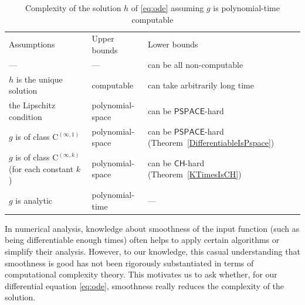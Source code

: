 \documentclass[12pt,a4paper]{article}
\theoremstyle{definition}
\theoremstyle{remark}
\newcommand{\classPSPACE}{\mathsf{PSPACE}}
\newcommand{\classCH}{\mathsf{CH}}
\newcommand{\classC}{\mathrm C}
\begin{document}
\begin{table}
\renewcommand\arraystretch{1.3}
\begin{center}
 \caption{Complexity of the solution $h$ of \eqref{eq:ode}
 assuming $g$ is polynomial-time computable}
 \label{table:related}
\small\vspace{3pt}
 \begin{tabular}{lll}
  Assumptions & Upper bounds & Lower bounds \\
  \noalign{\smallskip}
  \hline
  \noalign{\smallskip}
   --- & --- & can be all non-computable \cite{pour1979computable} \\
  $h$ is the unique solution & computable \cite{coddington1955theory}
  & \parbox[t]{14em}{can take arbitrarily long time\\\cite{ko1983computational,miller1970recursive}} \\
  the Lipschitz condition  & polynomial-space \cite{ko1983computational}
      &	can be $\classPSPACE$-hard \cite{kawamura2010lipschitz}\\
  $g$ is of class $\classC ^{(\infty, 1)}$ & polynomial-space 
      & \parbox[t]{12em}{can be $\classPSPACE$-hard\\(Theorem~\ref{DifferentiableIsPspace})} \\
  \parbox[t]{10.55em}{$g$ is of class $\classC ^{(\infty, k)}$\\{}(for each constant $k$)}
  & polynomial-space 
  & can be $\classCH$-hard (Theorem~\ref{KTimesIsCH}) \\
  $g$ is analytic
  & polynomial-time \cite{muller1987uniform,ko1988computing,kawamura2010complexity} 
  & ---
 \end{tabular}
\end{center}
\end{table}

In numerical analysis, 
knowledge about smoothness of the input function 
(such as being differentiable enough times) 
often helps
to apply certain algorithms or simplify their analysis.
However, 
to our knowledge, 
this casual understanding that smoothness is good 
has not been rigorously substantiated 
in terms of computational complexity theory. 
This motivates us to ask whether, 
for our differential equation \eqref{eq:ode}, 
smoothness really reduces the complexity of the solution. 
\end{document}
